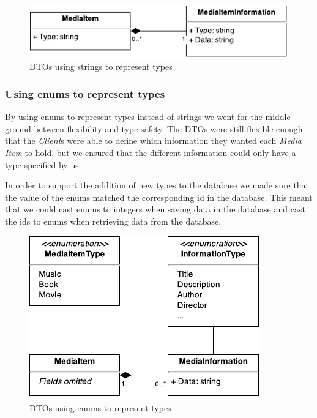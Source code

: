 \documentclass[../report.tex]{subfiles}
\begin{document}
\begin{figure}[!h]
\label{fig:dto_types_string}
\centering
\includegraphics[scale=0.7]{../img/typesAsString.pdf}
\caption{DTOs using strings to represent types}
\end{figure}

\subsubsection{Using enums to represent types}
By using enums to represent types instead of strings we went for the middle ground between flexibility and type safety. The DTOs were still flexible enough that the \textit{Client}s were able to define which information they wanted each \textit{Media Item} to hold, but we ensured that the different information could only have a type specified by us.

In order to support the addition of new types to the database we made sure that the value of the enums matched the corresponding id in the database. This meant that we could cast enums to integers when saving data in the database and cast the ids to enums when retrieving data from the database. 

\begin{figure}[!h]
\label{fig:dto_types_enum}
\centering
\includegraphics[scale=0.7]{../img/typesAsEnum.pdf}
\caption{DTOs using enums to represent types}
\end{figure}
\end{document}
